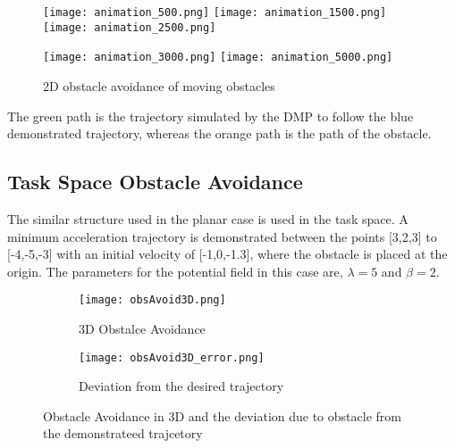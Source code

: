 \begin{figure}[!htp]
    \centering
    \texttt{[image: animation\_500.png]}\quad
    \texttt{[image: animation\_1500.png]}\quad
    \texttt{[image: animation\_2500.png]}

    \medskip

    \texttt{[image: animation\_3000.png]}\quad
    \texttt{[image: animation\_5000.png]}

    \caption{2D obstacle avoidance of moving obstacles}
    \label{fig:2D_moveObs}
\end{figure}
The green path is the trajectory simulated by the DMP to follow the blue demonstrated trajectory, whereas the orange path is the path of the obstacle.




\subsection{Task Space Obstacle Avoidance}
The similar structure used in the planar case is used in the task space. A minimum acceleration trajectory is demonstrated 
between the points [3,2,3] to [-4,-5,-3] with an initial velocity of [-1,0,-1.3], where the obstacle is placed at the origin. The 
parameters for the potential field in this case are, $\lambda = 5 \text{ and } \beta = 2$.

\begin{figure}[!htp]
    \centering
    \begin{subfigure}{0.5\textwidth}
        \texttt{[image: obsAvoid3D.png]}
        \caption{3D Obstalce Avoidance}
        \label{fig:obsAvoid3D}
    \end{subfigure}%
    \begin{subfigure}{0.5\textwidth}
        \centering
        \texttt{[image: obsAvoid3D\_error.png]}
        \caption{Deviation from the desired trajectory}
        \label{fig:obsAvoid3D_error}
    \end{subfigure}
    \caption{Obstacle Avoidance in 3D and the deviation due to obstacle from the demonstrateed trajcetory}
    \label{fig:obsAvoid3Dfar}
\end{figure}

